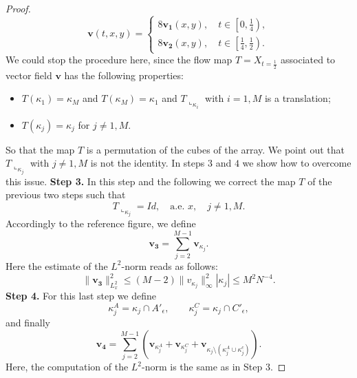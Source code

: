 \documentclass[10pt,a4paper]{amsart}
\begin{document}
\begin{proof}
 \begin{equation*}
     \mathbf v(t,x,y)=\begin{cases}
         8 \mathbf{v_1}(x,y),\quad t\in\left[0,\frac{1}{4}\right), \\
         8 \mathbf{v_2}(x,y), \quad t\in\left[\frac{1}{4},\frac{1}{2}\right).
     \end{cases}
 \end{equation*}
 We could stop the procedure here, since the flow map $T=X_{t=\frac{1}{2}}$ associated to vector field $\mathbf v$ has the following properties:
 \begin{itemize}
     \item $T(\kappa_1)=\kappa_M$ and $T(\kappa_M)=\kappa_1$ and $T\llcorner_{ \kappa_i}$ with $i=1,M$ is a translation;
     \item $T(\kappa_j)=\kappa_j$ for $j\not=1,M$.
 \end{itemize}
So that the map $T$ is a permutation of the cubes of the array. We point out that $T\llcorner_{\kappa_j}$ with $j\not=1,M$ is not the identity. In steps $3$ and $4$ we show how to overcome this issue. 
     \textbf{Step 3.} In this step and the following we correct the map $T$ of the previous two steps such that
     \begin{equation*}
         T\llcorner_{\kappa_j}=Id,\quad \text{a.e. }x,  \quad j\not=1,M. 
     \end{equation*}
     Accordingly to the reference figure, we define
     \begin{equation*}
         \mathbf{v_3}=\sum_{j=2}^{M-1}  \mathbf v_{\kappa_j}.
     \end{equation*}
     Here the estimate of the $L^2$-norm reads as follows:
     \begin{equation*}
         \|\mathbf{v_3}\|^2_{L^2_x}\leq (M-2)\|v_{\kappa_j}\|^2_\infty |\kappa_j|\leq M^2N^{-4}.
     \end{equation*}
     \textbf{Step 4.}
     For this last step we define
     \begin{equation*}
         \kappa_j^A=\kappa_j\cap A'_{\epsilon},\qquad \kappa_j^C=\kappa_j\cap C'_\epsilon,
     \end{equation*}
     and finally
     \begin{equation*}
         \mathbf{v_4}=\sum_{j=2}^{M-1}\left(\mathbf{v}_{\kappa_j^A}+\mathbf{v}_{\kappa_j^C}+\mathbf{v}_{\kappa_j\setminus(\kappa_j^A\cup\kappa_j^c)}\right).
     \end{equation*}
     Here, the computation of the $L^2$-norm is the same as in Step 3. 


\end{proof}
\end{document}
